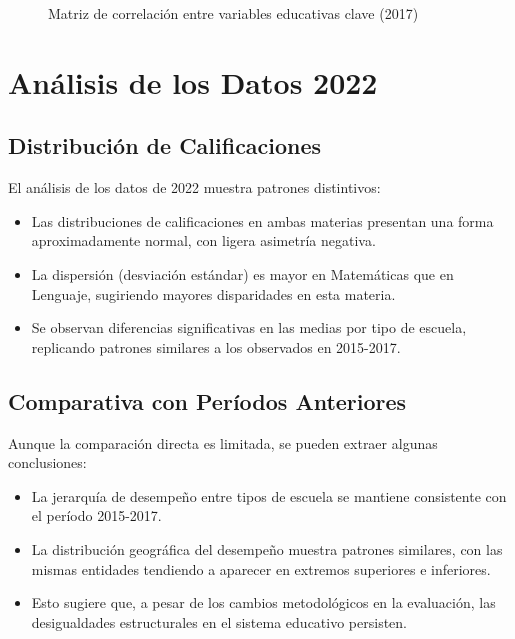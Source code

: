 \begin{figure}[h]
    \centering
    \caption{Matriz de correlación entre variables educativas clave (2017)}
    \label{fig:matriz_correlacion}
\end{figure}

\section{Análisis de los Datos 2022}

\subsection{Distribución de Calificaciones}
El análisis de los datos de 2022 muestra patrones distintivos:

\begin{itemize}
    \item Las distribuciones de calificaciones en ambas materias presentan una forma aproximadamente normal, con ligera asimetría negativa.
    
    \item La dispersión (desviación estándar) es mayor en Matemáticas que en Lenguaje, sugiriendo mayores disparidades en esta materia.
    
    \item Se observan diferencias significativas en las medias por tipo de escuela, replicando patrones similares a los observados en 2015-2017.
\end{itemize}

\subsection{Comparativa con Períodos Anteriores}
Aunque la comparación directa es limitada, se pueden extraer algunas conclusiones:

\begin{itemize}
    \item La jerarquía de desempeño entre tipos de escuela se mantiene consistente con el período 2015-2017.
    
    \item La distribución geográfica del desempeño muestra patrones similares, con las mismas entidades tendiendo a aparecer en extremos superiores e inferiores.
    
    \item Esto sugiere que, a pesar de los cambios metodológicos en la evaluación, las desigualdades estructurales en el sistema educativo persisten.
\end{itemize}

